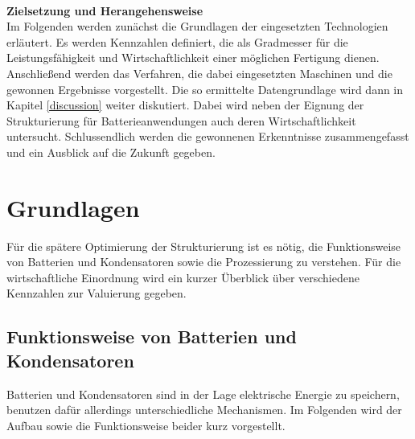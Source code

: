 \documentclass[a4paper, 11pt, headsepline,footsepline,twoside,abstract]{scrbook}
\begin{document}
\\
\vspace{0.3cm}
\textbf{\large{Zielsetzung und Herangehensweise}}\\
Im Folgenden werden zunächst die Grundlagen der eingesetzten Technologien erläutert. Es werden Kennzahlen definiert, die als Gradmesser für die Leistungsfähigkeit und Wirtschaftlichkeit einer möglichen Fertigung dienen. Anschließend werden das Verfahren, die dabei eingesetzten Maschinen und die gewonnen Ergebnisse vorgestellt. Die so ermittelte Datengrundlage wird dann in Kapitel \ref{discussion} weiter diskutiert. Dabei wird neben der Eignung der Strukturierung für Batterieanwendungen auch deren Wirtschaftlichkeit untersucht. Schlussendlich werden die gewonnenen Erkenntnisse zusammengefasst und ein Ausblick auf die Zukunft gegeben.
\newpage
\chapter{Grundlagen}
Für die spätere Optimierung der Strukturierung ist es nötig, die Funktionsweise von Batterien und Kondensatoren sowie die Prozessierung zu verstehen. Für die wirtschaftliche Einordnung wird ein kurzer Überblick über verschiedene Kennzahlen zur Valuierung gegeben.
\section{Funktionsweise von Batterien und Kondensatoren}
Batterien und Kondensatoren sind in der Lage elektrische Energie zu speichern, benutzen dafür allerdings unterschiedliche Mechanismen. Im Folgenden wird der Aufbau sowie die Funktionsweise beider kurz vorgestellt.
\end{document}
